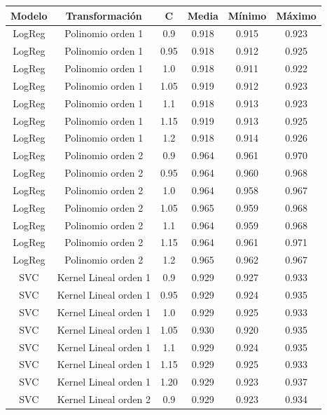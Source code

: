 \documentclass[11pt]{article}
\begin{document}
\begin{table}[H]
\centering
\begin{tabular}{|c|c|c|c|c|c|}
    \hline
    \textbf{Modelo} & \textbf{Transformación} & \textbf{C} & \textbf{Media} & \textbf{Mínimo} & \textbf{Máximo} \\
    \hline
    LogReg & Polinomio orden 1 & 0.9 & 0.918 & 0.915 & 0.923 \\
    LogReg & Polinomio orden 1 & 0.95 & 0.918 & 0.912 & 0.925 \\
    LogReg & Polinomio orden 1 & 1.0 & 0.918 & 0.911 & 0.922 \\
    LogReg & Polinomio orden 1 & 1.05 & 0.919 & 0.912 & 0.923 \\
    LogReg & Polinomio orden 1 & 1.1 & 0.918 & 0.913 & 0.923 \\
    LogReg & Polinomio orden 1 & 1.15 & 0.919 & 0.913 & 0.925 \\
    LogReg & Polinomio orden 1 & 1.2 & 0.918 & 0.914 & 0.926 \\
    LogReg & Polinomio orden 2 & 0.9 & 0.964 & 0.961 & 0.970 \\
    LogReg & Polinomio orden 2 & 0.95 & 0.964 & 0.960 & 0.968 \\
    LogReg & Polinomio orden 2 & 1.0 & 0.964 & 0.958 & 0.967 \\
    LogReg & Polinomio orden 2 & 1.05 & 0.965 & 0.959 & 0.968 \\
    LogReg & Polinomio orden 2 & 1.1 & 0.964 & 0.959 & 0.968 \\
    LogReg & Polinomio orden 2 & 1.15 & 0.964 & 0.961 & 0.971 \\
    LogReg & Polinomio orden 2 & 1.2 & 0.965 & 0.962 & 0.967 \\
    SVC & Kernel Lineal orden 1 & 0.9 & 0.929 & 0.927 & 0.933 \\
    SVC & Kernel Lineal orden 1 & 0.95 & 0.929 & 0.924 & 0.935 \\
    SVC & Kernel Lineal orden 1 & 1.0 & 0.929 & 0.925 & 0.933 \\
    SVC & Kernel Lineal orden 1 & 1.05 & 0.930 & 0.920 & 0.935 \\
    SVC & Kernel Lineal orden 1 & 1.1 & 0.929 & 0.924 & 0.935 \\
    SVC & Kernel Lineal orden 1 & 1.15 & 0.929 & 0.925 & 0.933 \\
    SVC & Kernel Lineal orden 1 & 1.20 & 0.929 & 0.923 & 0.937 \\
    SVC & Kernel Lineal orden 2 & 0.9 & 0.929 & 0.923 & 0.934 \\

\end{tabular}
\end{table}
\end{document}
